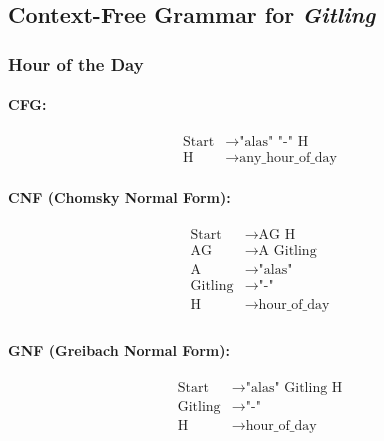 \subsection{Context-Free Grammar for \textit{Gitling}}

\subsubsection{Hour of the Day}

\paragraph{CFG:}

\begin{align}
    \text{Start}   & \rightarrow \text{"alas" "-" H}   \\
    \text{H} & \rightarrow \text{any\_hour\_of\_day}           
\end{align}

\paragraph{CNF (Chomsky Normal Form):}

\begin{equation*}
    \begin{aligned}
        \text{Start}   & \rightarrow \text{AG H} \\
        \text{AG}      & \rightarrow \text{A Gitling}\\
        \text{A}    & \rightarrow \text{"alas"}\\
        \text{Gitling} & \rightarrow \text{"-"}\\
        \text{H}   & \rightarrow \text{hour\_of\_day}\\
    \end{aligned}
\end{equation*}

\paragraph{GNF (Greibach Normal Form):}

\begin{equation*}
    \begin{aligned}
        \text{Start}   & \rightarrow \text{"alas" Gitling H}\\
        \text{Gitling} & \rightarrow \text{"-"}\\
        \text{H}   & \rightarrow \text{hour\_of\_day}\\
    \end{aligned}
\end{equation*}

